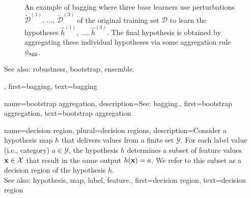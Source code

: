{{{\begin{figure}[htbp]
\begin{center}
		\caption{An example of bagging where three base learners use perturbations  
		$\widetilde{\mathcal{D}}^{(1)},\,\ldots,\,\widetilde{\mathcal{D}}^{(3)}$ of 
		the original training set $\mathcal{D}$ to learn the hypotheses 
		$\widehat{h}^{(1)},\,\ldots,\,\widehat{h}^{(3)}$. The final 
		hypothesis is obtained by aggregating these individual hypotheses 
		via some aggregation rule $\phi_{\rm agg}$.}
		\end{center}
		\end{figure}
		See also: robustness, bootstrap, ensemble.},
	first={bagging},
	text={bagging}
}

{name={bootstrap aggregation}, 
 description={See: bagging.},
 first={bootstrap aggregation},
 text={bootstrap aggregation} 
}	

{name={decision region}, plural={decision regions}, 
	description={Consider 
		a hypothesis map $h$ that delivers values from a finite set $\mathcal{Y}$. 
		For each label value (i.e., category) $a \in \mathcal{Y}$, the hypothesis $h$ 
		determines a subset of feature values ${\bf x} \in \mathcal{X}$ that result 
		in the same output $h({\bf x})=a$. We refer to this subset as a decision 
		region of the hypothesis $h$. \\
		See also: hypothesis, map, label, feature.},
	first={decision region},
	text={decision region} 
}

}
